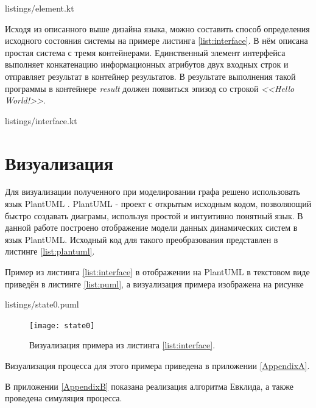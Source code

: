  {listings/element.kt}

Исходя из описанного выше дизайна языка, можно составить способ определения исходного состояния системы на примере листинга \ref{list:interface}.
В нём описана простая система с тремя контейнерами.
Единственный элемент интерфейса выполняет конкатенацию информационных атрибутов двух входных строк и отправляет результат в контейнер результатов.
В результате выполнения такой программы в контейнере \textit{result} должен появиться эпизод со строкой \textit{<<Hello World!>>}.

 {listings/interface.kt}


\section{Визуализация}

Для визуализации полученного при моделировании графа решено использовать язык PlantUML \cite{plantuml2018Guide}.
PlantUML - проект с открытым исходным кодом, позволяющий быстро создавать диаграмы, используя простой и интуитивно понятный язык.
В данной работе построено отображение модели данных динамических систем в язык PlantUML. 
Исходный код для такого преобразования представлен в листинге \ref{list:plantuml}.

Пример из листинга \ref{list:interface} в отображении на PlantUML в текстовом виде приведён в листинге \ref{list:puml}, а визуализация примера изображена на рисунке 

 {listings/state0.puml}

\begin{figure}[h]
	\centering
	\texttt{[image: state0]}
	\caption{Визуализация примера из листинга \ref{list:interface}.}
	\label{fig:interface}
\end{figure}

Визуализация процесса для этого примера приведена в приложении \ref{AppendixA}.

В приложении \ref{AppendixB} показана реализация алгоритма Евклида, а также проведена симуляция процесса.




